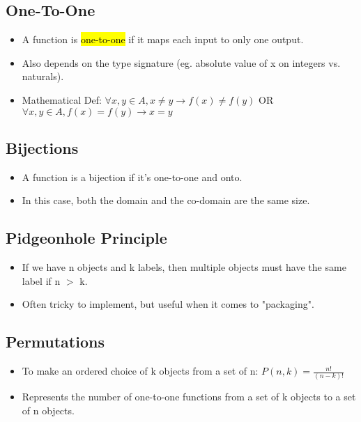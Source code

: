\subsection{One-To-One}
\begin{itemize}
    \item A function is \hl{one-to-one} if it maps each input to only one output.
    \item Also depends on the type signature (eg. absolute value of x on integers vs. naturals).
    \item Mathematical Def: $\forall x, y \in A, x\neq y \rightarrow f(x) \neq f(y)$ OR $\forall x, y \in A, f(x)=f(y)\rightarrow x=y$
\end{itemize}

\subsection{Bijections}
\begin{itemize}
    \item A function is a bijection if it's one-to-one and onto.
    \item In this case, both the domain and the co-domain are the same size.
\end{itemize}

\subsection{Pidgeonhole Principle}
\begin{itemize}
    \item If we have n objects and k labels, then multiple objects must have the same label if n $>$ k.
    \item Often tricky to implement, but useful when it comes to "packaging".
\end{itemize}

\subsection{Permutations}
\begin{itemize}
    \item To make an ordered choice of k objects from a set of n: $P(n, k) = \frac{n!}{(n-k)!}$
    \item Represents the number of one-to-one functions from a set of k objects to a set of n objects.
\end{itemize}